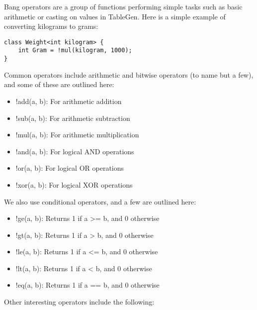 
Bang operators are a group of functions performing simple tasks such as basic arithmetic or casting on values in TableGen. Here is a simple example of converting kilograms to grams:

\begin{lstlisting}[style=styleCXX]
class Weight<int kilogram> {
	int Gram = !mul(kilogram, 1000);
}
\end{lstlisting}

Common operators include arithmetic and bitwise operators (to name but a few), and some of these are outlined here:

\begin{itemize}
\item !add(a, b): For arithmetic addition
\item !sub(a, b): For arithmetic subtraction
\item !mul(a, b): For arithmetic multiplication
\item !and(a, b): For logical AND operations
\item !or(a, b): For logical OR operations
\item !xor(a, b): For logical XOR operations
\end{itemize}

We also use conditional operators, and a few are outlined here:

\begin{itemize}
\item !ge(a, b): Returns 1 if a >= b, and 0 otherwise
\item !gt(a, b): Returns 1 if a > b, and 0 otherwise
\item !le(a, b): Returns 1 if a <= b, and 0 otherwise
\item !lt(a, b): Returns 1 if a < b, and 0 otherwise
\item !eq(a, b): Returns 1 if a == b, and 0 otherwise
\end{itemize}

Other interesting operators include the following:

